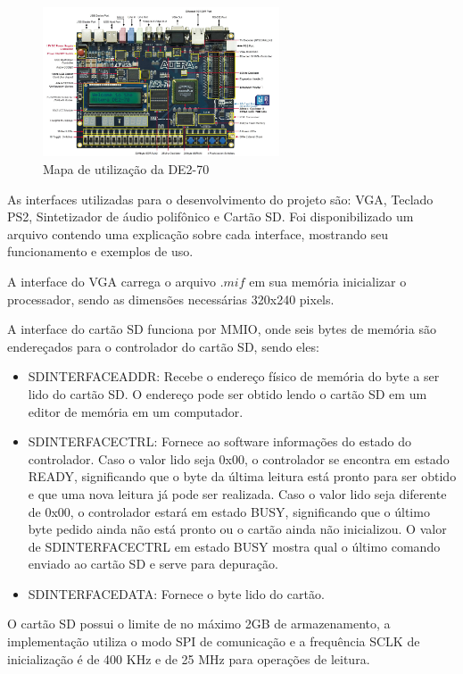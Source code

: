 \documentclass{vgtc}                          %
\begin{document}
\begin{figure}[htb]
  \centering
  \includegraphics[width=2.76in]{altera.jpg}
 \caption{Mapa de utilização da DE2-70}
\end{figure}


As interfaces utilizadas para o desenvolvimento do projeto são: VGA, Teclado PS2, Sintetizador de áudio polifônico e Cartão SD. Foi disponibilizado um arquivo contendo uma explicação sobre cada interface, mostrando seu funcionamento e exemplos de uso.


A interface do VGA carrega o arquivo $.mif$ em sua memória inicializar o processador, sendo as dimensões necessárias 320x240 pixels.

A interface do cartão SD funciona por MMIO, onde seis bytes de memória são endereçados para o controlador do cartão SD, sendo eles:
\begin{itemize}
\item SDINTERFACEADDR: Recebe o endereço físico de memória do byte a ser lido do cartão SD. O endereço pode ser obtido lendo o cartão SD em um editor de memória em um computador.
\item SDINTERFACECTRL: Fornece ao software informações do estado do controlador. Caso o valor lido seja 0x00, o controlador se encontra em estado READY, significando que o byte da última leitura está pronto para ser obtido e que uma nova leitura já pode ser realizada. Caso o valor lido seja diferente de 0x00, o controlador estará em estado BUSY, significando que o último byte pedido ainda não está pronto ou o cartão ainda não inicializou. O valor de SDINTERFACECTRL em estado BUSY mostra qual o último comando enviado ao cartão SD e serve para depuração.
\item SDINTERFACEDATA: Fornece o byte lido do cartão.
\end{itemize}

O cartão SD possui o limite de no máximo 2GB de armazenamento, a implementação utiliza o modo SPI de comunicação e a frequência SCLK de inicialização é de 400 KHz e de 25 MHz para operações de leitura.
\end{document}
